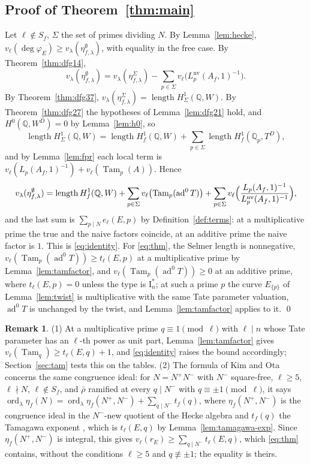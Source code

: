 \documentclass[11pt]{amsart}
\theoremstyle{definition}
\newtheorem{remark}[theorem]{Remark}
\newcommand{\Q}{\mathbb{Q}}
\newcommand{\degphi}{\deg\varphi_E}
\newcommand{\ord}{\operatorname{ord}}
\newcommand{\ad}{\operatorname{ad}^0}
\newcommand{\nv}{\mathrm{nv}}
\newcommand{\Tam}{\operatorname{Tam}}
\newcommand{\len}{\operatorname{length}}
\begin{document}
\subsection{Proof of Theorem~\ref{thm:main}}
Let $\ell\notin S_f$, $\Sigma$ the set of primes dividing $N$. By Lemma~\ref{lem:hecke}, $v_\ell(\degphi)\ge v_\lambda(\eta^\emptyset_{f,\lambda})$, with equality in the free case. By Theorem~\ref{thm:dfg14},
\[
v_\lambda(\eta^\emptyset_{f,\lambda})=v_\lambda(\eta^\Sigma_{f,\lambda})-\sum_{p\in\Sigma}v_\ell\bigl(L_p^{\nv}(A_f,1)^{-1}\bigr).
\]
By Theorem~\ref{thm:dfg37}, $v_\lambda(\eta^\Sigma_{f,\lambda})=\len H^1_\Sigma(\Q,W)$. By Theorem~\ref{thm:dfg27} the hypotheses of Lemma~\ref{lem:dfg21} hold, and $H^0(\Q,W^D)=0$ by Lemma~\ref{lem:h0}, so
\[
\len H^1_\Sigma(\Q,W)=\len H^1_f(\Q,W)+\sum_{p\in\Sigma}\len H^1_f(\Q_p,T^D),
\]
and by Lemma~\ref{lem:fpr} each local term is $v_\ell(L_p(A_f,1)^{-1})+v_\ell(\Tam_p(A))$. Hence
\[
v_\lambda(\eta^\emptyset_{f,\lambda})=\len H^1_f(\Q,W)+\sum_{p\in\Sigma}v_\ell\bigl(\Tam_p(\ad T)\bigr)+\sum_{p\in\Sigma}v_\ell\Bigl(\frac{L_p(A_f,1)^{-1}}{L^{\nv}_p(A_f,1)^{-1}}\Bigr),
\]
and the last sum is $\sum_{p\mid N}e_\ell(E,p)$ by Definition~\ref{def:terms}: at a multiplicative prime the true and the naive factors coincide, at an additive prime the naive factor is $1$. This is \eqref{eq:identity}. For \eqref{eq:thm}, the Selmer length is nonnegative, $v_\ell(\Tam_p(\ad T))\ge t_\ell(E,p)$ at a multiplicative prime by Lemma~\ref{lem:tamfactor}, and $v_\ell(\Tam_p(\ad T))\ge0$ at an additive prime, where $t_\ell(E,p)=0$ unless the type is $\mathrm{I}_n^*$; at such a prime $p$ the curve $E_{\{p\}}$ of Lemma~\ref{lem:twist} is multiplicative with the same Tate parameter valuation, $\ad T$ is unchanged by the twist, and Lemma~\ref{lem:tamfactor} applies to it. \qed

\begin{remark}\label{rem:ko}
(1) At a multiplicative prime $q\equiv1\pmod\ell$ with $\ell\mid n$ whose Tate parameter has an $\ell$-th power as unit part, Lemma~\ref{lem:tamfactor} gives $v_\ell(\Tam_q)\ge t_\ell(E,q)+1$, and \eqref{eq:identity} raises the bound accordingly; Section~\ref{sec:tam} tests this on the tables. (2) The formula of Kim and Ota \cite[Theorem 1.1]{KimOta} concerns the same congruence ideal: for $N=N^+N^-$ with $N^-$ square-free, $\ell\ge5$, $\ell\nmid N$, $\ell\notin S_f$, and $\bar\rho$ ramified at every $q\mid N^-$ with $q\equiv\pm1\pmod\ell$, it says $\ord_\lambda\eta_f(N)=\ord_\lambda\eta_f(N^+,N^-)+\sum_{q\mid N^-}t_f(q)$, where $\eta_f(N^+,N^-)$ is the congruence ideal in the $N^-$-new quotient of the Hecke algebra and $t_f(q)$ the Tamagawa exponent \cite[Definition 2.12]{KimOta}, which is $t_\ell(E,q)$ by Lemma~\ref{lem:tamagawa-exp}. Since $\eta_f(N^+,N^-)$ is integral, this gives $v_\ell(r_E)\ge\sum_{q\mid N^-}t_\ell(E,q)$, which \eqref{eq:thm} contains, without the conditions $\ell\ge5$ and $q\not\equiv\pm1$; the equality is theirs.
\end{remark}
\end{document}
